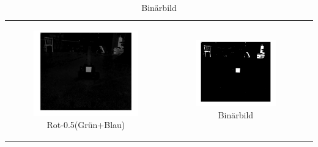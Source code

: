 \begin{center}
\begin{table}[ht]
\begin{tabular}{c c c}
\begin{subfigure}{0.3\textwidth}
\includegraphics[scale=0.08]{Figures/r-g-b.png}  
\vspace{-3.5mm}\caption{Rot-0.5(Grün+Blau)}
\end{subfigure}&\begin{subfigure}{0.3\textwidth}\centering

\includegraphics[scale=0.08]{Figures/binaerbild.png} \vspace{-3.5mm}\caption{Binärbild}
\end{subfigure}
\end{tabular}
\end{table}
\end{center}
\vspace{-5mm}

